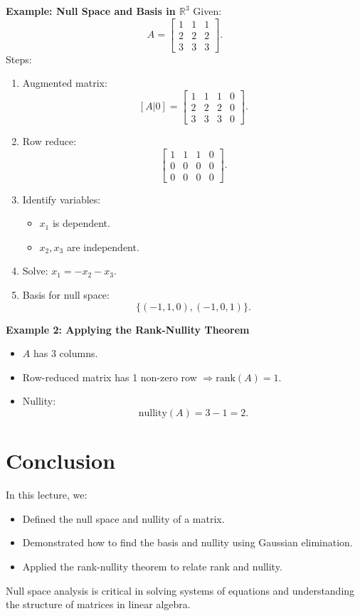 \documentclass{article}
\begin{document}
\textbf{Example: Null Space and Basis in $\mathbb{R}^3$}
Given:
\[
  A =
  \begin{bmatrix}
    1 & 1 & 1 \\
    2 & 2 & 2 \\
    3 & 3 & 3
  \end{bmatrix}.
\]
Steps:
\begin{enumerate}
  \item Augmented matrix:
    \[
      [A | 0] =
      \begin{bmatrix}
        1 & 1 & 1 & 0 \\
        2 & 2 & 2 & 0 \\
        3 & 3 & 3 & 0
      \end{bmatrix}.
    \]
  \item Row reduce:
    \[
      \begin{bmatrix}
        1 & 1 & 1 & 0 \\
        0 & 0 & 0 & 0 \\
        0 & 0 & 0 & 0
      \end{bmatrix}.
    \]
  \item Identify variables:
    \begin{itemize}
      \item $x_1$ is dependent.
      \item $x_2, x_3$ are independent.
    \end{itemize}
  \item Solve: $x_1 = -x_2 - x_3$.
  \item Basis for null space:
    \[
      \{(-1, 1, 0), (-1, 0, 1)\}.
    \]
\end{enumerate}

\textbf{Example 2: Applying the Rank-Nullity Theorem}
\begin{itemize}
  \item $A$ has 3 columns.
  \item Row-reduced matrix has 1 non-zero row $\Rightarrow \text{rank}(A) = 1$.
  \item Nullity:
    \[
      \text{nullity}(A) = 3 - 1 = 2.
    \]
\end{itemize}

\section*{Conclusion}

In this lecture, we:
\begin{itemize}
  \item Defined the null space and nullity of a matrix.
  \item Demonstrated how to find the basis and nullity using Gaussian elimination.
  \item Applied the rank-nullity theorem to relate rank and nullity.
\end{itemize}

Null space analysis is critical in solving systems of equations and understanding the structure of matrices in linear algebra.
\end{document}
